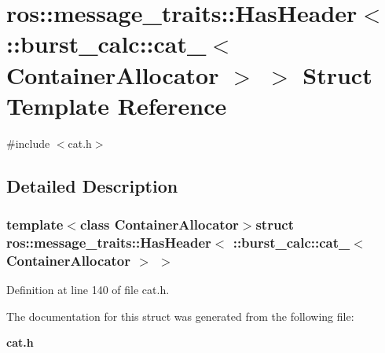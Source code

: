 \section{ros\-:\-:message\-\_\-traits\-:\-:\-Has\-Header$<$ \-:\-:burst\-\_\-calc\-:\-:cat\-\_\-$<$ \-Container\-Allocator $>$ $>$ \-Struct \-Template \-Reference}
\label{structros_1_1message__traits_1_1HasHeader_3_01_1_1burst__calc_1_1cat___3_01ContainerAllocator_01_4_01_4}


{\ttfamily \#include $<$cat.\-h$>$}



\subsection{\-Detailed \-Description}
\subsubsection*{template$<$class Container\-Allocator$>$struct ros\-::message\-\_\-traits\-::\-Has\-Header$<$ \-::burst\-\_\-calc\-::cat\-\_\-$<$ Container\-Allocator $>$ $>$}



\-Definition at line 140 of file cat.\-h.



\-The documentation for this struct was generated from the following file\-:\begin{DoxyCompactItemize}
\item 
{\bf cat.\-h}\end{DoxyCompactItemize}
